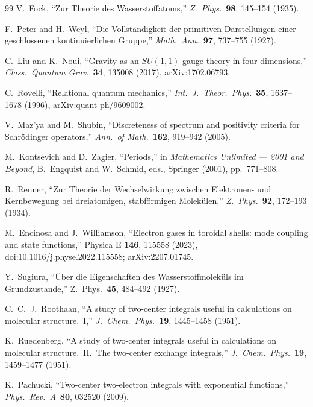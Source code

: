 \documentclass[aps,pra,twocolumn,superscriptaddress,longbibliography]{revtex4-2}
\begin{document}
\begin{thebibliography}{99}
V.~Fock, ``Zur Theorie des Wasserstoffatoms,''
\textit{Z.\ Phys.}\ \textbf{98}, 145--154 (1935).

F.~Peter and H.~Weyl,
``Die Vollst\"andigkeit der primitiven Darstellungen einer
geschlossenen kontinuierlichen Gruppe,''
\textit{Math.\ Ann.}\ \textbf{97}, 737--755 (1927).

C.~Liu and K.~Noui, ``Gravity as an $SU(1,1)$ gauge theory in four
dimensions,'' \textit{Class.\ Quantum Grav.}\ \textbf{34}, 135008 (2017),
arXiv:1702.06793.

C.~Rovelli, ``Relational quantum mechanics,''
\textit{Int.\ J.\ Theor.\ Phys.}\ \textbf{35}, 1637--1678 (1996),
arXiv:quant-ph/9609002.

V.~Maz'ya and M.~Shubin, ``Discreteness of spectrum and positivity criteria
for Schr\"odinger operators,''
\textit{Ann.\ of Math.}\ \textbf{162}, 919--942 (2005).

M.~Kontsevich and D.~Zagier, ``Periods,'' in \textit{Mathematics
Unlimited --- 2001 and Beyond}, B.~Engquist and W.~Schmid, eds.,
Springer (2001), pp.~771--808.

R.~Renner, ``Zur Theorie der Wechselwirkung zwischen Elektronen- und
Kernbewegung bei dreiatomigen, stabf\"ormigen Molek\"ulen,''
\textit{Z.~Phys.}\ \textbf{92}, 172--193 (1934).

M.~Encinosa and J.~Williamson, ``Electron gases in toroidal shells: mode
coupling and state functions,'' Physica E \textbf{146}, 115558 (2023),
doi:10.1016/j.physe.2022.115558; arXiv:2207.01745.

Y.~Sugiura, ``\"Uber die Eigenschaften des Wasserstoffmolek\"uls im
Grundzustande,'' Z.~Phys.\ \textbf{45}, 484--492 (1927).

C.~C.~J.~Roothaan, ``A study of two-center integrals useful in
calculations on molecular structure.\ I,''
\textit{J.\ Chem.\ Phys.}\ \textbf{19}, 1445--1458 (1951).

K.~Ruedenberg, ``A study of two-center integrals useful in calculations
on molecular structure.\ II.\ The two-center exchange integrals,''
\textit{J.\ Chem.\ Phys.}\ \textbf{19}, 1459--1477 (1951).

K.~Pachucki, ``Two-center two-electron integrals with exponential functions,''
\textit{Phys.\ Rev.\ A}\ \textbf{80}, 032520 (2009).


\end{thebibliography}
\end{document}
